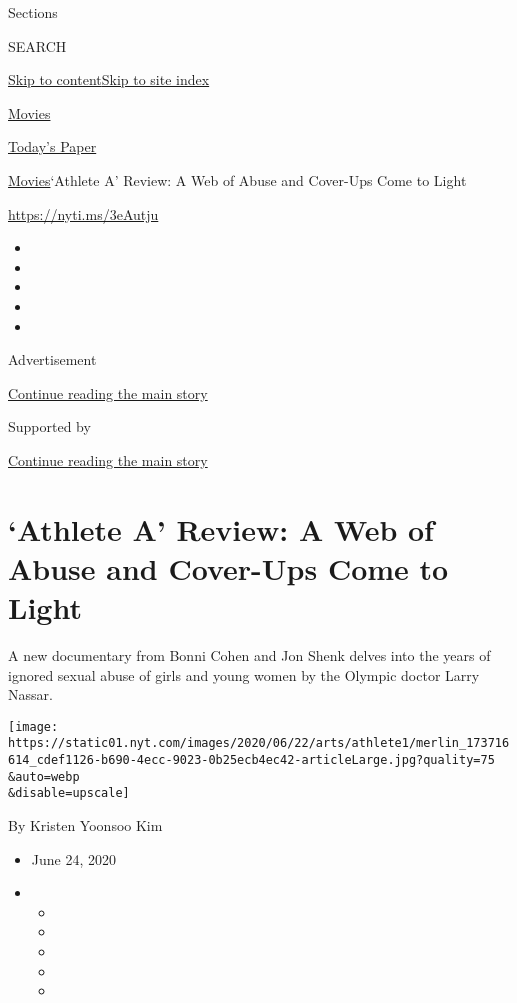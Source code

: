 Sections

SEARCH

\protect\hyperlink{site-content}{Skip to
content}\protect\hyperlink{site-index}{Skip to site index}

\href{https://www.nytimes.com/section/movies}{Movies}

\href{https://myaccount.nytimes.com/auth/login?response_type=cookie\&client_id=vi}{}

\href{https://www.nytimes.com/section/todayspaper}{Today's Paper}

\href{/section/movies}{Movies}\textbar{}`Athlete A' Review: A Web of
Abuse and Cover-Ups Come to Light

\url{https://nyti.ms/3eAutju}

\begin{itemize}
\item
\item
\item
\item
\item
\end{itemize}

Advertisement

\protect\hyperlink{after-top}{Continue reading the main story}

Supported by

\protect\hyperlink{after-sponsor}{Continue reading the main story}

\hypertarget{athlete-a-review-a-web-of-abuse-and-cover-ups-come-to-light}{%
\section{`Athlete A' Review: A Web of Abuse and Cover-Ups Come to
Light}\label{athlete-a-review-a-web-of-abuse-and-cover-ups-come-to-light}}

A new documentary from Bonni Cohen and Jon Shenk delves into the years
of ignored sexual abuse of girls and young women by the Olympic doctor
Larry Nassar.

\texttt{[image: https://static01.nyt.com/images/2020/06/22/arts/athlete1/merlin\_173716614\_cdef1126-b690-4ecc-9023-0b25ecb4ec42-articleLarge.jpg?quality=75\\\&auto=webp\\\&disable=upscale]}

By Kristen Yoonsoo Kim

\begin{itemize}
\item
  June 24, 2020
\item
  \begin{itemize}
  \item
  \item
  \item
  \item
  \item
  \end{itemize}
\end{itemize}

